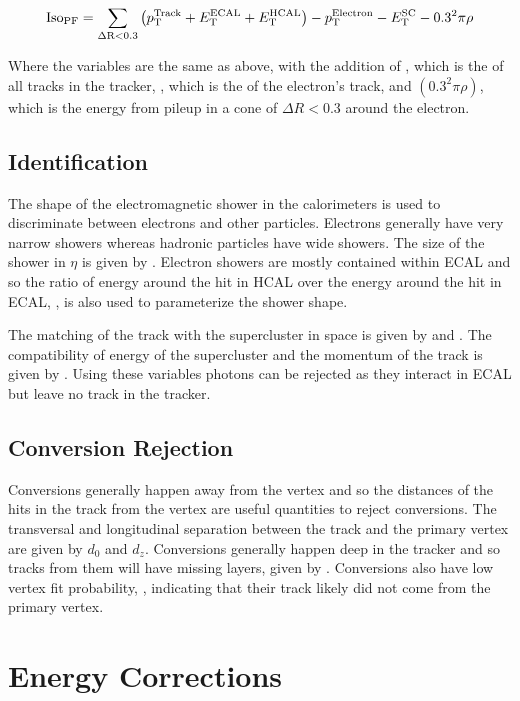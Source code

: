 \begin{equation}
    \text{Iso}_{\text{PF}} = \sum_{\Delta \text{R}<0.3} \left(p_{\mathrm{T}}^{\text{Track}} + E_{\mathrm{T}}^{\text{ECAL}} + E_{\mathrm{T}}^{\text{HCAL}}\right) - p_{\mathrm{T}}^{\text{Electron}}
    - E_{\mathrm{T}}^{\text{SC}} - 0.3^{2} \pi \rho
\end{equation}

Where the variables are the same as above, with the addition of \ptTrack, which
is the \pt of all tracks in the tracker, \ptElectron, which is the \pt of the
electron's track, and $\left(0.3^{2} \pi \rho\right)$, which is the energy from
pileup in a cone of $\Delta R < 0.3$ around the electron.

\subsection{Identification}

The shape of the electromagnetic shower in the calorimeters is used to
discriminate between electrons and other particles. Electrons generally have
very narrow showers whereas hadronic particles have wide showers. The size of
the shower in $\eta$ is given by \sigmaietaieta. Electron showers are mostly
contained within ECAL and so the ratio of energy around the hit in HCAL over
the energy around the hit in ECAL, \HOverE, is also used to parameterize the
shower shape.

The matching of the track with the supercluster in \coordetaphi space is given
by \dphiin and \detain.  The compatibility of energy of the supercluster and
the momentum of the track is given by \ooeoop. Using these variables photons
can be rejected as they interact in ECAL but leave no track in the tracker.

\subsection{Conversion Rejection}

Conversions generally happen away from the vertex and so the distances of the
hits in the track from the vertex are useful quantities to reject conversions.
The transversal and longitudinal separation between the track and the primary
vertex are given by $d_{0}$ and $d_{z}$. Conversions generally happen deep in
the tracker and so tracks from them will have missing layers, given by \nmiss.
Conversions also have low vertex fit probability, \pvtx, indicating that their
track likely did not come from the primary vertex.

\section{Energy Corrections}
